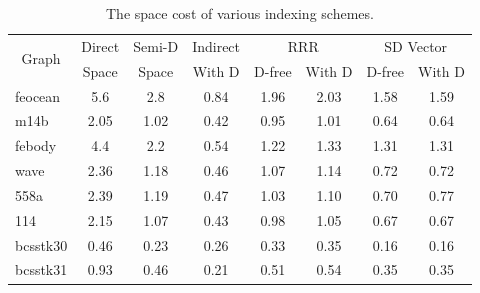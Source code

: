 \documentclass[12pt,glossary]{dalthesis}
\begin{document}
\begin{table}[h]
\centering
\caption{The space cost of various indexing schemes.}
\label{my-label}
\begin{tabular}{|l||c||c||c||c|c||c|c|}
\hline
\multicolumn{1}{|c||}{\multirow{2}{*}{Graph}} & Direct & Semi-D & Indirect & \multicolumn{2}{c||}{RRR} & \multicolumn{2}{c|}{SD Vector} \\\cline{2-8}
\multicolumn{1}{|c||}{}                       & Space  & Space  & With D   & D-free     & With D     & D-free        & With D        \\ \hline
feocean                                    & 5.6    & 2.8    & 0.84     & 1.96       & 2.03       & 1.58          & 1.59          \\
m14b                                       & 2.05   & 1.02   & 0.42     & 0.95       & 1.01       & 0.64          & 0.64          \\
febody                                     & 4.4    & 2.2    & 0.54     & 1.22       & 1.33       & 1.31          & 1.31          \\
wave                                       & 2.36   & 1.18   & 0.46     & 1.07       & 1.14       & 0.72          & 0.72          \\
558a                                       & 2.39   & 1.19   & 0.47     & 1.03       & 1.10       & 0.70          & 0.77          \\
114                                        & 2.15   & 1.07   & 0.43     & 0.98       & 1.05       & 0.67          & 0.67          \\
bcsstk30                                   & 0.46   & 0.23   & 0.26     & 0.33       & 0.35       & 0.16          & 0.16          \\
bcsstk31                                   & 0.93   & 0.46   & 0.21     & 0.51       & 0.54       & 0.35          & 0.35          \\ \hline
\end{tabular}
\end{table}
\end{document}
